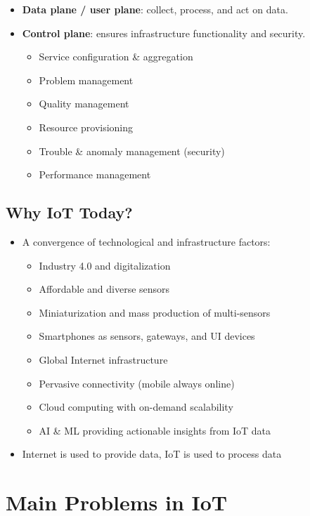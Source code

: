 \begin{itemize}
    \item \textbf{Data plane / user plane}: collect, process, and act on data.
    \item \textbf{Control plane}: ensures infrastructure functionality and security.
    \begin{itemize}
        \item Service configuration \& aggregation
        \item Problem management
        \item Quality management
        \item Resource provisioning
        \item Trouble \& anomaly management (security)
        \item Performance management
    \end{itemize}
\end{itemize}

\subsection{Why IoT Today?}

\begin{itemize}
    \item A convergence of technological and infrastructure factors:
    \begin{itemize}
        \item Industry 4.0 and digitalization
        \item Affordable and diverse sensors
        \item Miniaturization and mass production of multi-sensors
        \item Smartphones as sensors, gateways, and UI devices
        \item Global Internet infrastructure
        \item Pervasive connectivity (mobile always online)
        \item Cloud computing with on-demand scalability
        \item AI \& ML providing actionable insights from IoT data
    \end{itemize}
    \item Internet is used to provide data, IoT is used to process data
\end{itemize}

\section{Main Problems in IoT}

